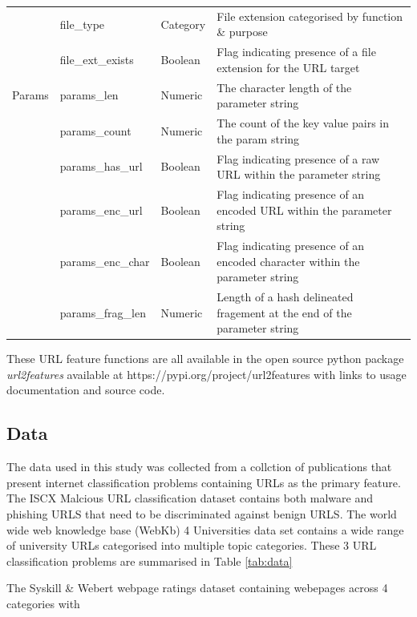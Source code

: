 \documentclass[sigconf]{acmart}
\begin{document}
\begin{table}
\begin{tabular}{|l|l|l|l|}
              &file\_type             &Category    &File extension categorised by function \& purpose    \\
              &file\_ext\_exists      &Boolean     &Flag indicating presence of a file extension for the URL target  \\
\midrule
Params        &params\_len            &Numeric     &The character length of the parameter string    \\
              &params\_count          &Numeric     &The count of the key value pairs in the param string    \\
              &params\_has\_url       &Boolean     &Flag indicating presence of a raw URL within the parameter string   \\
              &params\_enc\_url       &Boolean     &Flag indicating presence of an encoded URL within the parameter string   \\
              &params\_enc\_char      &Boolean     &Flag indicating presence of an encoded character within the parameter string   \\
              &params\_frag\_len      &Numeric     &Length of a hash delineated fragement at the end of the parameter string   \\
\bottomrule
\end{tabular}
\end{table}



These URL feature functions are all available in the open source python package \emph{url2features}
available at https://pypi.org/project/url2features with links to usage documentation and source
code.

\subsection{Data}

The data used in this study was collected from a collction of publications that 
present internet classification problems containing URLs as the primary feature.
The ISCX Malcious URL classification dataset contains both malware and phishing URLS 
that need to be discriminated against benign URLS\cite{Mamun2016}.
The world wide web knowledge base (WebKb) 4 Universities data set contains a wide
range of university URLs categorised into multiple topic categories\cite{Craven1998}.
These 3 URL classification problems are summarised in Table \ref{tab:data}

The Syskill \& Webert webpage ratings dataset containing webepages across 4 categories
with \cite{Pazzani1996}
\end{document}
